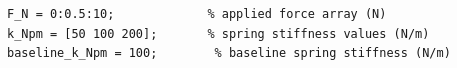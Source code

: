 \documentclass[border=12pt]{standalone}
\begin{document}
\begin{lstlisting}[style=matlab]
F_N = 0:0.5:10;             % applied force array (N)
k_Npm = [50 100 200];       % spring stiffness values (N/m)
baseline_k_Npm = 100;        % baseline spring stiffness (N/m)
\end{lstlisting}
\end{document}
